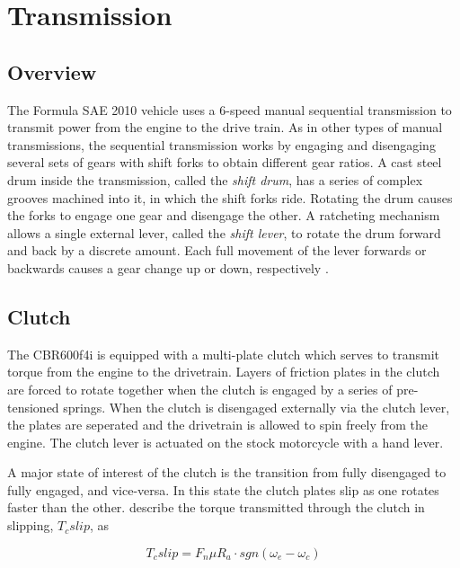 \section{Transmission}

\subsection{Overview}

The Formula SAE 2010 vehicle uses a 6-speed manual sequential transmission to transmit power from the engine to the drive train. As in other types of manual transmissions, the sequential transmission works by engaging and disengaging several sets of gears with shift forks to obtain different gear ratios. A cast steel drum inside the transmission, called the \emph{shift drum}, has a series of complex grooves machined into it, in which the shift forks ride. Rotating the drum causes the forks to engage one gear and disengage the other. A ratcheting mechanism allows a single external lever, called the \emph{shift lever}, to rotate the drum forward and back by a discrete amount. Each full movement of the lever forwards or backwards causes a gear change up or down, respectively \cite{HowtoManualTransmission, cbr600}.

\subsection{Clutch}

The CBR600f4i is equipped with a multi-plate clutch which serves to transmit torque from the engine to the drivetrain. Layers of friction plates in the clutch are forced to rotate together when the clutch is engaged by a series of pre-tensioned springs. When the clutch is disengaged externally via the clutch lever, the plates are seperated and the drivetrain is allowed to spin freely from the engine. The clutch lever is actuated on the stock motorcycle with a hand lever.

A major state of interest of the clutch is the transition from fully disengaged to fully engaged, and vice-versa. In this state the clutch plates slip as one rotates faster than the other.  describe the torque transmitted through the clutch in slipping, $T_c{slip}$, as

\begin{equation}\label{eq:clutch_slip}
  T_c{slip}=F_n\mu R_a \cdot sgn\left(\omega_e-\omega_c\right)
\end{equation}

